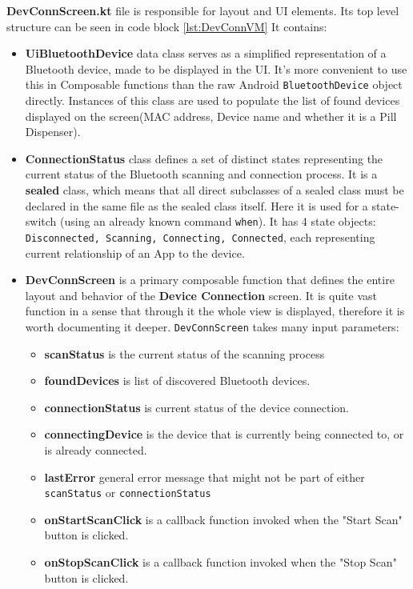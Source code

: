 \newpage
\textbf{DevConnScreen.kt} file is responsible for layout and \ac{UI} elements. Its top level structure can be seen in code block \ref{lst:DevConnVM} It contains:
\begin{itemize}
	\item \textbf{UiBluetoothDevice} data class serves as a simplified representation of a Bluetooth device, made to be displayed in the \ac{UI}. It's more convenient to use this in Composable functions than the raw Android \texttt{BluetoothDevice} object directly. Instances of this class are used to populate the list of found devices displayed on the screen(\ac{MAC} address, Device name and whether it is a Pill Dispenser).
	\item \textbf{ConnectionStatus} class defines a set of distinct states representing the current status of the Bluetooth scanning and connection process. It is a \textbf{sealed} class, which means that all direct subclasses of a sealed class must be declared in the same file as the sealed class itself. Here it is used for a state-switch (using an already known command \texttt{when}). It has 4 state objects: \texttt{Disconnected, Scanning, Connecting, Connected}, each representing current relationship of an App to the device.
	\item \textbf{DevConnScreen} is a primary composable function that defines the entire layout and behavior of the \textbf{Device Connection} screen. It is quite vast function in a sense that through it the whole view is displayed, therefore it is worth documenting it deeper. \texttt{DevConnScreen} takes many input parameters:
	\begin{itemize}
		\item \textbf{scanStatus} is the current status of the scanning process
		\item \textbf{foundDevices} is list of discovered Bluetooth devices.
		\item \textbf{connectionStatus} is current status of the device connection.
		\item \textbf{connectingDevice} is the device that is currently being connected to, or is already connected.
		\item \textbf{lastError} general error message that might not be part of either  \texttt{scanStatus} or \texttt{connectionStatus}
		\item \textbf{onStartScanClick} is a callback function invoked when the "Start Scan" button is clicked.
		\item \textbf{onStopScanClick} is a callback function invoked when the "Stop Scan" button is clicked.

\end{itemize}
\end{itemize}
